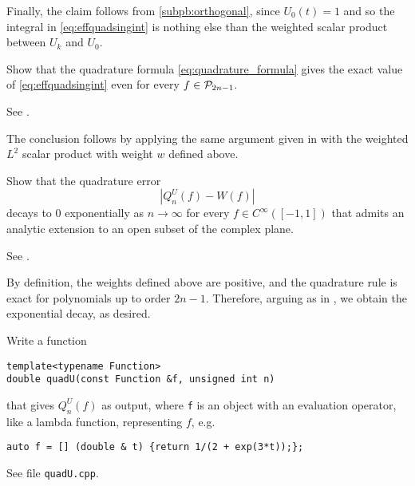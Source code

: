 \begin{problem}
\begin{subproblem}[4]
\begin{solution}
Finally, the claim follows from \ref{subpb:orthogonal}, since $U_0(t)=1$ and so the integral in  \eqref{eq:effquadsingint} is nothing else than the weighted scalar product between $U_k$ and $U_0$.
\end{solution}
\end{subproblem}

\begin{subproblem}[2]
Show that the quadrature formula \eqref{eq:quadrature_formula} gives the exact value of \eqref{eq:effquadsingint}  even for every $f\in {\cal P}_{2n-1}$.
 \begin{hint}
See .
\end{hint}
\begin{solution}
The conclusion follows by applying the same argument given in   with the weighted $L^2$ scalar product with weight $w$ defined above.
\end{solution}
\end{subproblem}

\begin{subproblem}[3]
Show that the quadrature error
\[
|Q^U_n(f)-W(f)|
\]
decays to $0$ exponentially as $n\to \infty$ for every $f\in C^\infty([-1,1])$ that admits an analytic extension to an open subset of the complex plane.
\begin{hint}
See .
\end{hint}
\begin{solution}
By definition, the weights defined above are positive, and the quadrature rule is exact for polynomials up to order $2n-1$. Therefore, arguing as in , we obtain the exponential decay, as desired.
\end{solution}
\end{subproblem}

\begin{subproblem}[2]
Write a \Cpp{} function
\begin{lstlisting}
template<typename Function>
double quadU(const Function &f, unsigned int n)
\end{lstlisting}
that gives $Q^U_n(f)$ as output, where \texttt{f} is an object with an evaluation operator, like a lambda function, representing $f$, e.g.
\begin{lstlisting}
auto f = [] (double & t) {return 1/(2 + exp(3*t));};
\end{lstlisting}
\begin{solution}
See file \texttt{quadU.cpp}.
\end{solution}
\end{subproblem}



\end{problem}

